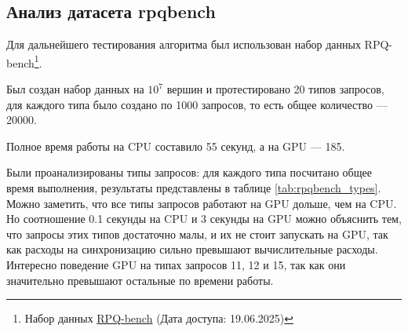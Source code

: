 \subsection{Анализ датасета rpqbench}

Для дальнейшего тестирования алгоритма был использован набор данных RPQ-bench\footnote{Набор данных \href{https://github.com/Mamenglu/LD-RPQB}{RPQ-bench} (Дата доступа: 19.06.2025)}.

Был создан набор данных на $10^7$ вершин и протестировано 20 типов запросов, для каждого типа было создано по 1000 запросов, то есть общее количество --- 20000.

Полное время работы на CPU составило 55 секунд, а на GPU --- 185.

Были проанализированы типы запросов: для каждого типа посчитано общее время выполнения, результаты представлены в таблице \ref{tab:rpqbench_types}. Можно заметить, что все типы запросов работают на GPU дольше, чем на CPU. Но соотношение 0.1 секунды на CPU и 3 секунды на GPU можно объяснить тем, что запросы этих типов достаточно малы, и их не стоит запускать на GPU, так как расходы на синхронизацию сильно превышают вычислительные расходы.
Интересно поведение GPU на типах запросов 11, 12 и 15, так как они значительно превышают остальные по времени работы.

